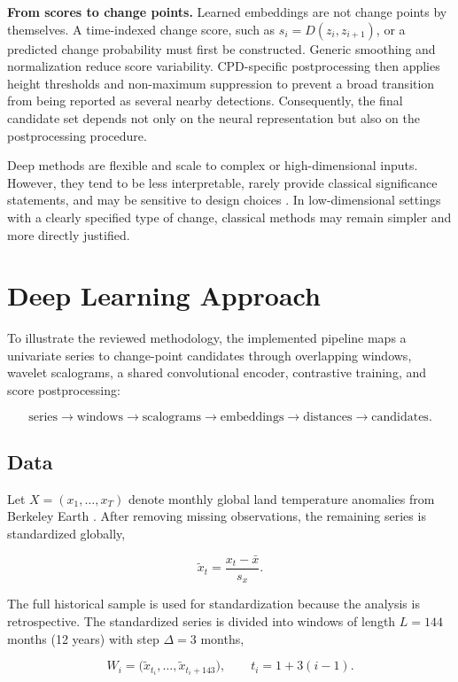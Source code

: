 \documentclass[
]{krantz}
\begin{document}
\textbf{From scores to change points.} Learned embeddings are not change points by themselves. A time-indexed change score, such as \(s_i=D(z_i,z_{i+1})\), or a predicted change probability must first be constructed. Generic smoothing and normalization reduce score variability. CPD-specific postprocessing then applies height thresholds and non-maximum suppression to prevent a broad transition from being reported as several nearby detections. Consequently, the final candidate set depends not only on the neural representation but also on the postprocessing procedure.

Deep methods are flexible and scale to complex or high-dimensional inputs. However, they tend to be less interpretable, rarely provide classical significance statements, and may be sensitive to design choices \citep{xu2025}. In low-dimensional settings with a clearly specified type of change, classical methods may remain simpler and more directly justified.

\section{Deep Learning Approach}\label{deep-learning-approach}

To illustrate the reviewed methodology, the implemented pipeline maps a univariate series to change-point candidates through overlapping windows, wavelet scalograms, a shared convolutional encoder, contrastive training, and score postprocessing:

\[
\text{series}
\rightarrow
\text{windows}
\rightarrow
\text{scalograms}
\rightarrow
\text{embeddings}
\rightarrow
\text{distances}
\rightarrow
\text{candidates}.
\]

\subsection{Data}\label{data-3}

Let \(X=(x_1,\ldots,x_T)\) denote monthly global land temperature anomalies from Berkeley Earth \citep{berkeleyearth2024}. After removing missing observations, the remaining series is standardized globally,

\[
\tilde x_t=\frac{x_t-\bar x}{s_x}.
\]

The full historical sample is used for standardization because the analysis is retrospective. The standardized series is divided into windows of length \(L=144\) months (12 years) with step \(\Delta=3\) months,

\[
W_i
=
\bigl(\tilde x_{t_i},\ldots,\tilde x_{t_i+143}\bigr),
\qquad
t_i=1+3(i-1).
\]
\end{document}
